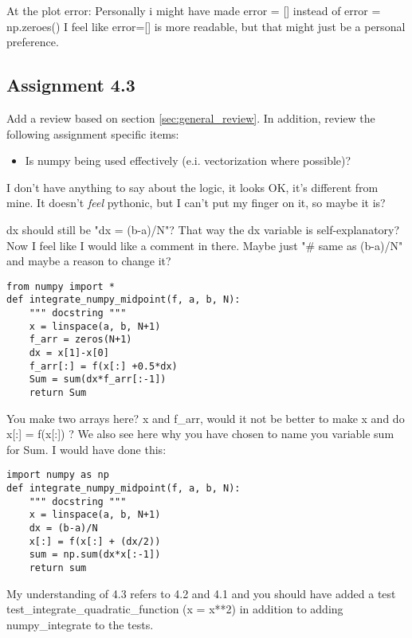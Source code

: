 \documentclass[a4paper]{article}
\begin{document}
At the plot error:
Personally i might have made error = [] instead of error = np.zeroes()
I feel like error=[] is more readable, but that might just be a personal preference. 



\subsection*{Assignment 4.3}
Add a review based on section \ref{sec:general_review}. In addition, review the following assignment specific items: 
\begin{itemize}
  \item Is numpy being used effectively (e.i. vectorization where possible)?
\end{itemize}

I don't have anything to say about the logic, it looks OK, it's different from mine.
\newline It doesn't \textit{feel} pythonic, but I can't put my finger on it, so maybe it is?
    
dx should still be "dx = (b-a)/N"?
That way the dx variable is self-explanatory?
Now I feel like I would like a comment in there.
Maybe just "\# same as (b-a)/N" and maybe a reason to change it?
\newline
\begin{verbatim}
from numpy import *
def integrate_numpy_midpoint(f, a, b, N):
	""" docstring """
	x = linspace(a, b, N+1)
	f_arr = zeros(N+1)
	dx = x[1]-x[0]
	f_arr[:] = f(x[:] +0.5*dx)
	Sum = sum(dx*f_arr[:-1])
	return Sum
\end{verbatim}
    
You make two arrays here?
x and f\_arr, would it not be better to make x and do
x[:] = f(x[:]) ? We also see here why you have chosen to name you variable sum for Sum. I would have done this:

\begin{verbatim}
import numpy as np
def integrate_numpy_midpoint(f, a, b, N):
	""" docstring """
	x = linspace(a, b, N+1)
	dx = (b-a)/N
	x[:] = f(x[:] + (dx/2))
	sum = np.sum(dx*x[:-1])
	return sum
\end{verbatim}


My understanding of 4.3 refers to 4.2 and 4.1 and you should have added 
a test test\_integrate\_quadratic\_function (x = x**2) in addition to adding 
numpy\_integrate to the tests.
\end{document}
